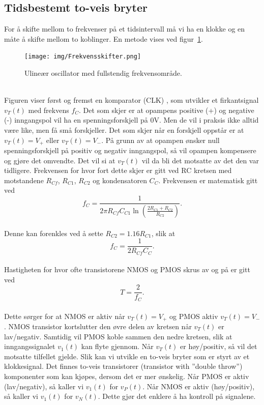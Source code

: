 \documentclass[a4paper,11pt,norsk]{article}
\begin{document}
\subsection{Tidsbestemt to-veis bryter}\label{sec: tidsbestemt bryter}
For å skifte mellom to frekvenser på et tidsintervall må vi ha en klokke og en måte å skifte mellom to koblinger. En metode vises ved figur~\ref{fig: frekvensskifter}.
\begin{figure}[!htbp]
    \centering
    \texttt{[image: img/Frekvensskifter.png]}
    \caption{Ulineær oscillator med fullstendig frekvensområde.}
    \label{fig: frekvensskifter}
\end{figure} \\
Figuren viser først og fremst en komparator (CLK) \cite{Square wave generator}, som utvikler et firkantsignal $v_T(t)$ med frekvens $f_C$. 
Det som skjer er at opampens positive (+) og negative (-) inngangspol vil ha en spenningsforskjell på 0V. Men de vil i praksis ikke alltid være like, men få små forskjeller. Det som skjer når en forskjell oppstår er at $v_T(t) = V_+$ eller $v_T(t) = V_-$. På grunn av at opampen ønsker null spenningsforskjell på positiv og negativ inngangspol, så vil opampen kompensere og gjøre det omvendte. Det vil si at $v_T(t)$ vil da bli det motsatte av det den var tidligere. Frekvensen for hvor fort dette skjer er gitt ved RC kretsen med motstandene $R_{Cf}$, $R_{C1}$, $R_{C2}$ og kondensatoren $C_C$. Frekvensen er matematisk gitt ved
\begin{equation}
    f_C = \frac{1}{2\pi R_{Cf} C_{C1} \ln \left( \frac{2R_{C1} + R_{C2}}{R_{C2}} \right)}.
\end{equation} \\
Denne kan forenkles ved å sette $R_{C2} = 1.16R_{C1}$, slik at
\begin{equation}\label{eq: f_C}
    f_C = \frac{1}{2R_{Cf}C_C}.
\end{equation} \\
Hastigheten for hvor ofte transistorene NMOS og PMOS skrus av og på er gitt ved
\begin{equation}\label{eq: T}
    T = \frac{2}{f_C}.
\end{equation} \\
Dette sørger for at NMOS er aktiv når $v_T(t) = V_+$ og PMOS aktiv $v_T(t) = V_-$.
NMOS transistor kortslutter den øvre delen av kretsen når $v_T(t)$ er lav/negativ. Samtidig vil PMOS koble sammen den nedre kretsen, slik at inngangssignalet $v_1(t)$ kan flyte gjennom. Når $v_T(t)$ er høy/positiv, så vil det motsatte tilfellet gjelde. Slik kan vi utvikle en to-veis bryter som er styrt av et klokkesignal. Det finnes to-veis transistorer (transistor with ''double throw'') komponenter som kan kjøpes, dersom det er mer ønskelig. Når PMOS er aktiv (lav/negativ), så kaller vi $v_1(t)$ for $v_P(t)$. Når NMOS er aktiv (høy/positiv), så kaller vi $v_1(t)$ for $v_N(t)$. Dette gjør det enklere å ha kontroll på signalene.
\end{document}
